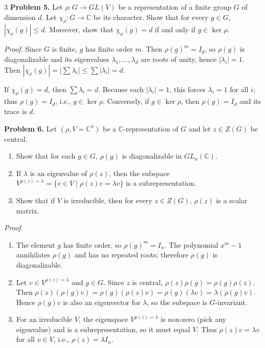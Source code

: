 \documentclass[10pt,landscape]{article}
\begin{document}
\begin{multicols}{3}
\noindent\textbf{Problem 5.} Let \(\rho:G\to GL(V)\) be a representation of a finite group \(G\) of dimension \(d\). Let \(\chi_\rho:G\to\mathbb{C}\) be its character. Show that for every \(g\in G\), \(|\chi_\rho(g)|\le d\). Moreover, show that \(\chi_\rho(g)=d\) if and only if \(g\in\ker\rho\).

\textit{Proof.} Since \(G\) is finite, \(g\) has finite order \(m\). Then \(\rho(g)^m=I_d\), so \(\rho(g)\) is diagonalizable and its eigenvalues \(\lambda_1,\dots,\lambda_d\) are roots of unity, hence \(|\lambda_i|=1\). Then \(|\chi_\rho(g)|=|\sum\lambda_i|\le\sum|\lambda_i|=d\).

If \(\chi_\rho(g)=d\), then \(\sum\lambda_i=d\). Because each \(|\lambda_i|=1\), this forces \(\lambda_i=1\) for all \(i\); thus \(\rho(g)=I_d\), i.e., \(g\in\ker\rho\). Conversely, if \(g\in\ker\rho\), then \(\rho(g)=I_d\) and its trace is \(d\).

\noindent\textbf{Problem 6.} Let \((\rho,V=\mathbb{C}^n)\) be a \(\mathbb{C}\)-representation of \(G\) and let \(z\in Z(G)\) be central.

\begin{enumerate}
\item Show that for each \(g\in G\), \(\rho(g)\) is diagonalizable in \(GL_n(\mathbb{C})\).
\item If \(\lambda\) is an eigenvalue of \(\rho(z)\), then the subspace \(V^{\rho(z)=\lambda}=\{v\in V\mid \rho(z)v=\lambda v\}\) is a subrepresentation.
\item Show that if \(V\) is irreducible, then for every \(z\in Z(G)\), \(\rho(z)\) is a scalar matrix.
\end{enumerate}

\textit{Proof.}
\begin{enumerate}
\item The element \(g\) has finite order, so \(\rho(g)^m=I_n\). The polynomial \(x^m-1\) annihilates \(\rho(g)\) and has no repeated roots; therefore \(\rho(g)\) is diagonalizable.
\item Let \(v\in V^{\rho(z)=\lambda}\) and \(g\in G\). Since \(z\) is central, \(\rho(z)\rho(g)=\rho(g)\rho(z)\). Then \(\rho(z)(\rho(g)v)=\rho(g)(\rho(z)v)=\rho(g)(\lambda v)=\lambda(\rho(g)v)\). Hence \(\rho(g)v\) is also an eigenvector for \(\lambda\), so the subspace is \(G\)-invariant.
\item For an irreducible \(V\), the eigenspace \(V^{\rho(z)=\lambda}\) is non‑zero (pick any eigenvalue) and is a subrepresentation, so it must equal \(V\). Thus \(\rho(z)v=\lambda v\) for all \(v\in V\), i.e., \(\rho(z)=\lambda I_n\).
\end{enumerate}


\end{multicols}
\end{document}
